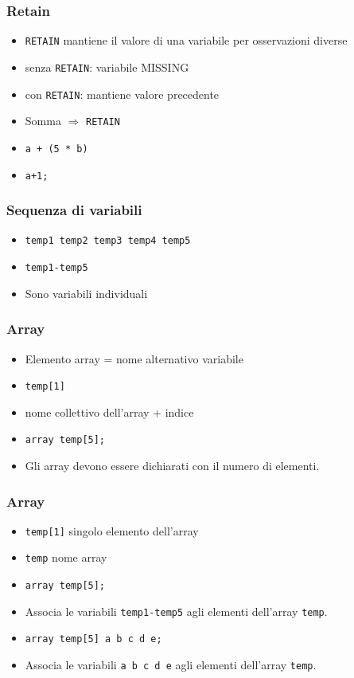 \begin{frame}[fragile]\frametitle{Retain}
  \begin{itemize}
  \item
    \verb+RETAIN+ mantiene il valore di una variabile per osservazioni diverse
  \item
    senza \verb+RETAIN+: variabile MISSING
  \item
    con \verb+RETAIN+: mantiene valore precedente
  \item
    Somma $\Rightarrow$ \verb+RETAIN+
  \item
    \verb!a + (5 * b)!
  \item
    \verb!a+1;!
  \end{itemize}
\end{frame}




\begin{frame}[containsverbatim]\frametitle{Sequenza di variabili}
  \begin{itemize}
  \item
    \verb+temp1 temp2 temp3 temp4 temp5+
  \item
    \verb+temp1-temp5+
  \item
    Sono variabili individuali
  \end{itemize}\end{frame}


\begin{frame}[containsverbatim]\frametitle{Array}
  \begin{itemize}
  \item
    Elemento array = nome alternativo variabile
  \item
    \verb!temp[1]!
  \item
    nome collettivo dell'array + indice
  \item
    \verb!array temp[5];!
  \item
    Gli array devono essere \alert{dichiarati} con il numero di elementi.
  \end{itemize}\end{frame}


\begin{frame}[containsverbatim]\frametitle{Array}
  \begin{itemize}
  \item
    \texttt{temp[1]} singolo elemento dell'array
  \item
    \texttt{temp} nome array
  \item
    \verb!array temp[5];!
  \item
    Associa le variabili \verb!temp1-temp5! agli elementi dell'array \verb!temp!.
  \item
    \verb!array temp[5] a b c d e;!
  \item
    Associa le variabili \verb!a b c d e! agli elementi dell'array \verb!temp!.
  \end{itemize}\end{frame}


